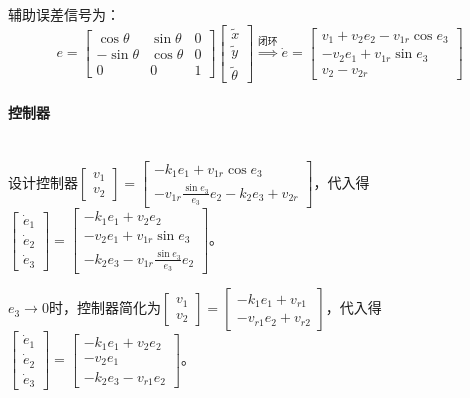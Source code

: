 \documentclass[
12pt, %
a4paper, 
oneside, %
headinclude,footinclude, %
]{scrartcl}
\begin{document}
辅助误差信号为：
$$ 
e = \begin{bmatrix} \cos\theta & \sin\theta & 0 \\ -\sin\theta & \cos\theta & 0 \\ 0 & 0 & 1 \end{bmatrix} \begin{bmatrix} \tilde{x} \\ \tilde{y} \\ \tilde{\theta} \end{bmatrix}
\overset{\text{闭环}}{\Longrightarrow}
\dot{e} = \begin{bmatrix} v_1 + v_2 e_2 - v_{1r} \cos e_3 \\ - v_2 e_1 + v_{1r} \sin e_3 \\ v_2 - v_{2r} \end{bmatrix} 
$$
\paragraph{控制器}~\\

设计控制器$ \begin{bmatrix} v_1 \\ v_2 \end{bmatrix} = \begin{bmatrix} -k_1 e_1 + v_{1r} \cos e_3 \\ -v_{1r} \frac{\sin e_3}{e_3} e_2 - k_2 e_3 + v_{2r} \end{bmatrix} $，代入得$ \begin{bmatrix} \dot{e}_1 \\ \dot{e}_2 \\ \dot{e}_3 \end{bmatrix} = \begin{bmatrix} -k_1 e_1 + v_2 e_2 \\ -v_2 e_1 + v_{1r} \sin e_3 \\ -k_2 e_3 - v_{1r} \frac{\sin e_3}{e_3} e_2 \end{bmatrix} $。

$ e_3 \to 0 $时，控制器简化为$ \begin{bmatrix} v_1 \\ v_2 \end{bmatrix} = \begin{bmatrix} -k_1 e_1 + v_{r1} \\ -v_{r1}  e_2 + v_{r2} \end{bmatrix} $，代入得$ \begin{bmatrix} \dot{e}_1 \\ \dot{e}_2 \\ \dot{e}_3 \end{bmatrix} = \begin{bmatrix} -k_1 e_1 + v_2 e_2 \\ -v_2 e_1 \\ -k_2 e_3 - v_{r1} e_2 \end{bmatrix} $。
\end{document}
